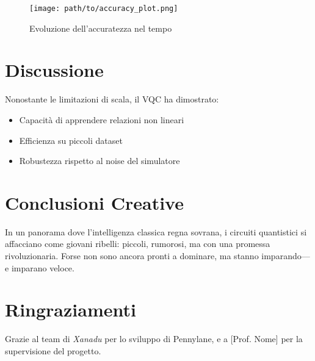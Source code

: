 \documentclass[10pt,twocolumn]{article}
\begin{document}
\begin{figure}[h]
    \centering
    \texttt{[image: path/to/accuracy\_plot.png]}
    \caption{Evoluzione dell’accuratezza nel tempo}
    \label{fig:acc}
\end{figure}

\section{Discussione}
Nonostante le limitazioni di scala, il VQC ha dimostrato:
\begin{itemize}
    \item Capacità di apprendere relazioni non lineari
    \item Efficienza su piccoli dataset
    \item Robustezza rispetto al noise del simulatore
\end{itemize}

\section{Conclusioni Creative}
In un panorama dove l’intelligenza classica regna sovrana, i circuiti quantistici si affacciano come giovani ribelli: piccoli, rumorosi, ma con una promessa rivoluzionaria. Forse non sono ancora pronti a dominare, ma stanno imparando—e imparano veloce.

\section*{Ringraziamenti}
Grazie al team di \textit{Xanadu} per lo sviluppo di Pennylane, e a [Prof. Nome] per la supervisione del progetto.



\end{document}
